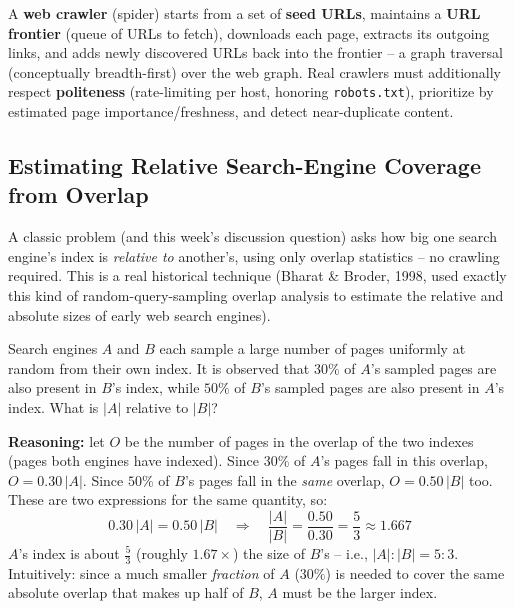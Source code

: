 \documentclass[11pt, a4paper]{article}
\begin{document}
\begin{defbox}
A \textbf{web crawler} (spider) starts from a set of \textbf{seed URLs}, maintains a \textbf{URL frontier} (queue of URLs to fetch), downloads each page, extracts its outgoing links, and adds newly discovered URLs back into the frontier -- a graph traversal (conceptually breadth-first) over the web graph. Real crawlers must additionally respect \textbf{politeness} (rate-limiting per host, honoring \texttt{robots.txt}), prioritize by estimated page importance/freshness, and detect near-duplicate content.
\end{defbox}

\subsection{Estimating Relative Search-Engine Coverage from Overlap}

A classic problem (and this week's discussion question) asks how big one search engine's index is \emph{relative to} another's, using only overlap statistics -- no crawling required. This is a real historical technique (Bharat \& Broder, 1998, used exactly this kind of random-query-sampling overlap analysis to estimate the relative and absolute sizes of early web search engines).

\begin{examplebox}
Search engines $A$ and $B$ each sample a large number of pages uniformly at random from their own index. It is observed that $30\%$ of $A$'s sampled pages are also present in $B$'s index, while $50\%$ of $B$'s sampled pages are also present in $A$'s index. What is $|A|$ relative to $|B|$?

\textbf{Reasoning:} let $O$ be the number of pages in the overlap of the two indexes (pages both engines have indexed). Since $30\%$ of $A$'s pages fall in this overlap, $O = 0.30\,|A|$. Since $50\%$ of $B$'s pages fall in the \emph{same} overlap, $O = 0.50\,|B|$ too. These are two expressions for the same quantity, so:
\[
0.30\,|A| = 0.50\,|B| \quad\Longrightarrow\quad \frac{|A|}{|B|} = \frac{0.50}{0.30} = \frac{5}{3} \approx 1.667
\]
$A$'s index is about $\frac53$ (roughly $1.67\times$) the size of $B$'s -- i.e., $|A|:|B| = 5:3$. Intuitively: since a much smaller \emph{fraction} of $A$ ($30\%$) is needed to cover the same absolute overlap that makes up half of $B$, $A$ must be the larger index.
\end{examplebox}
\end{document}
